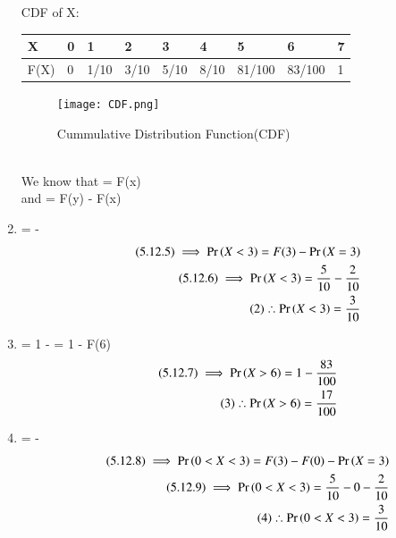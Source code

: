\documentclass[journal,12pt,twocolumn]{IEEEtran}
\begin{document}
\begin{enumerate}
 CDF of X:
 \begin{table}[h]
\begin{tabular}{|l|l|l|l|l|l|l|l|l|}
\hline
X    & 0 & 1    & 2    & 3    & 4    & 5      & 6      & 7 \\ \hline
F(X) & 0 & 1/10 & 3/10 & 5/10 & 8/10 & 81/100 & 83/100 & 1 \\ \hline
\end{tabular}
\end{table}
\begin{figure}[!htb]
    \centering    
	\texttt{[image: CDF.png]}
    \caption{Cummulative Distribution Function(CDF)}
\end{figure}
\\
 We know that  = F(x) \\
 and   = F(y) - F(x) \\
\item {} =  -  
 \begin{align}
 \tag{5.12.5}
 \implies \Pr\left(X < 3\right) =F(3)- \Pr\left(X = 3\right) \\
\tag{5.12.6}
\implies  \Pr\left(X < 3\right) = \frac{5}{10} - \frac{2}{10}   \\
\tag{2}
\therefore  \Pr\left(X < 3\right) = \frac{3}{10} 
   \end{align} 
 \item {} = 1 -  = 1 - F(6)
 \begin{align}
\tag{5.12.7}
\implies  \Pr\left(X > 6\right)  = 1 - \frac{83}{100} \\
\tag{3}
\therefore \Pr\left(X > 6\right) = \frac{17}{100} 
\end{align}
\item {} =  -   
\begin{align}
\tag{5.12.8}
\implies \Pr\left(0 < X < 3\right) = F(3) - F(0) - \Pr\left(X = 3\right) \\
 \tag{5.12.9}
\implies   \Pr\left(0 < X < 3\right) = \frac{5}{10} - 0 - \frac{2}{10} \\
\tag{4}              
    \therefore    \Pr\left(0 < X < 3\right) = \frac{3}{10}
\end{align}

\end{enumerate}
\end{document}
